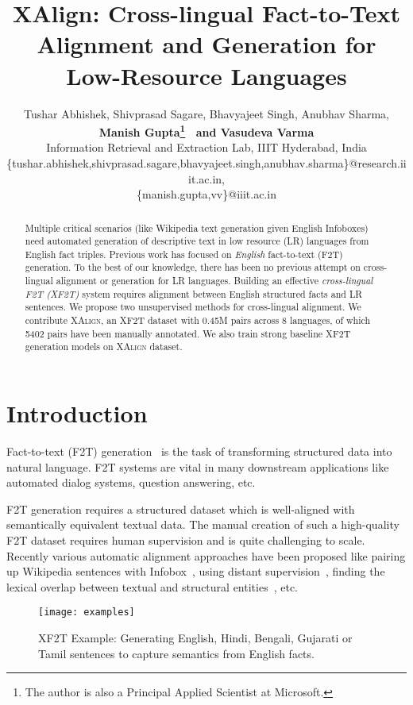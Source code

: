 \documentclass[11pt]{article}
\title{XAlign: Cross-lingual Fact-to-Text Alignment and Generation for Low-Resource Languages}
\author{Tushar Abhishek, Shivprasad Sagare, Bhavyajeet Singh, Anubhav Sharma,\\ {\bf Manish Gupta\thanks{The
author is also a Principal Applied Scientist at Microsoft.}~ and Vasudeva Varma} \\ Information Retrieval and Extraction Lab, IIIT Hyderabad, India \\ \{tushar.abhishek,shivprasad.sagare,bhavyajeet.singh,anubhav.sharma\}@research.iiit.ac.in,\\ \{manish.gupta,vv\}@iiit.ac.in}
\def\langCount{8}
\def\goldenCount{5402} \def\totalDataCount{0.45M}
\begin{document}
\maketitle
\begin{abstract}
Multiple critical scenarios (like Wikipedia text generation given English Infoboxes) need automated generation of descriptive text in low resource (LR) languages from English fact triples. Previous work has focused on \emph{English} fact-to-text (F2T) generation. To the best of our knowledge, there has been no previous attempt on cross-lingual alignment or generation for LR languages. 
Building an effective \emph{cross-lingual F2T (XF2T)} system requires alignment between English structured facts and LR sentences.  We propose two unsupervised methods for cross-lingual alignment. We contribute \textsc{XAlign}, an XF2T dataset with \totalDataCount{} pairs across \langCount{} languages, of which \goldenCount{} pairs have been manually annotated.
We also train strong baseline XF2T generation models on \textsc{XAlign} dataset.  \end{abstract}

\section{Introduction}
Fact-to-text (F2T) generation~\cite{reiter1997building} is the task of transforming structured data into natural language. F2T systems are vital in many downstream applications like automated dialog systems, question answering, etc.




F2T generation requires a structured dataset which is well-aligned with semantically equivalent textual data. The manual creation of such a high-quality F2T dataset requires human supervision and is quite challenging to scale. Recently various automatic alignment approaches have been proposed like pairing up Wikipedia sentences with Infobox~\cite{lebret2016wikibio}, using distant supervision~\cite{elsahar2018trex}, finding the lexical overlap between textual and structural entities~\cite{jin2020genwiki, fu2020partially, agarwal2021knowledge}, etc.

\begin{figure}[h!]
    \centering
    \texttt{[image: examples]}
    \caption{XF2T Example: Generating English, Hindi, Bengali, Gujarati or Tamil sentences to capture semantics from English facts.}
    \label{fig:examples}
\end{figure}
\end{document}
